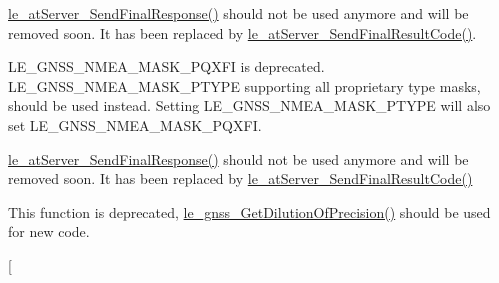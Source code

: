 
\begin{DoxyRefList}
\item[\label{deprecated__deprecated000009}%
\hypertarget{deprecated__deprecated000009}{}%
Page \hyperlink{c_atServer}{AT Commands Server} ]\hyperlink{le__at_server__interface_8h_a14c57753f986e5eb4928ea2eb350d9d9}{le\+\_\+at\+Server\+\_\+\+Send\+Final\+Response()} should not be used anymore and will be removed soon. It has been replaced by \hyperlink{le__at_server__interface_8h_ad3f175c366a50d92f8011d7062bdd147}{le\+\_\+at\+Server\+\_\+\+Send\+Final\+Result\+Code()}. 
\item[\label{deprecated__deprecated000003}%
\hypertarget{deprecated__deprecated000003}{}%
Page \hyperlink{platformConstraintsGnss}{G\+N\+SS platform constraints} ]L\+E\+\_\+\+G\+N\+S\+S\+\_\+\+N\+M\+E\+A\+\_\+\+M\+A\+S\+K\+\_\+\+P\+Q\+X\+FI is deprecated. L\+E\+\_\+\+G\+N\+S\+S\+\_\+\+N\+M\+E\+A\+\_\+\+M\+A\+S\+K\+\_\+\+P\+T\+Y\+PE supporting all proprietary type masks, should be used instead. Setting L\+E\+\_\+\+G\+N\+S\+S\+\_\+\+N\+M\+E\+A\+\_\+\+M\+A\+S\+K\+\_\+\+P\+T\+Y\+PE will also set L\+E\+\_\+\+G\+N\+S\+S\+\_\+\+N\+M\+E\+A\+\_\+\+M\+A\+S\+K\+\_\+\+P\+Q\+X\+FI. 
\item[\label{deprecated__deprecated000010}%
\hypertarget{deprecated__deprecated000010}{}%
Global \hyperlink{le__at_server__interface_8h_a14c57753f986e5eb4928ea2eb350d9d9}{le\+\_\+at\+Server\+\_\+\+Send\+Final\+Response} (le\+\_\+at\+Server\+\_\+\+Cmd\+Ref\+\_\+t command\+Ref, le\+\_\+at\+Server\+\_\+\+Final\+Rsp\+\_\+t final\+Response, bool custom\+String\+Available, const char $\ast$\+L\+E\+\_\+\+N\+O\+N\+N\+U\+LL final\+Rsp)]\hyperlink{le__at_server__interface_8h_a14c57753f986e5eb4928ea2eb350d9d9}{le\+\_\+at\+Server\+\_\+\+Send\+Final\+Response()} should not be used anymore and will be removed soon. It has been replaced by \hyperlink{le__at_server__interface_8h_ad3f175c366a50d92f8011d7062bdd147}{le\+\_\+at\+Server\+\_\+\+Send\+Final\+Result\+Code()} 
\item[\label{deprecated__deprecated000012}%
\hypertarget{deprecated__deprecated000012}{}%
Global \hyperlink{le__gnss__interface_8h_a70504e7c542d626aa07948d8330020c7}{le\+\_\+gnss\+\_\+\+Get\+Dop} (le\+\_\+gnss\+\_\+\+Sample\+Ref\+\_\+t position\+Sample\+Ref, uint16\+\_\+t $\ast$hdop\+Ptr, uint16\+\_\+t $\ast$vdop\+Ptr, uint16\+\_\+t $\ast$pdop\+Ptr)]This function is deprecated, \hyperlink{le__gnss__interface_8h_a87cbadea6fe7ebd8ef74d45bdeef1416}{le\+\_\+gnss\+\_\+\+Get\+Dilution\+Of\+Precision()} should be used for new code. 
\item[\label{deprecated__deprecated000011}%

\end{DoxyRefList}
